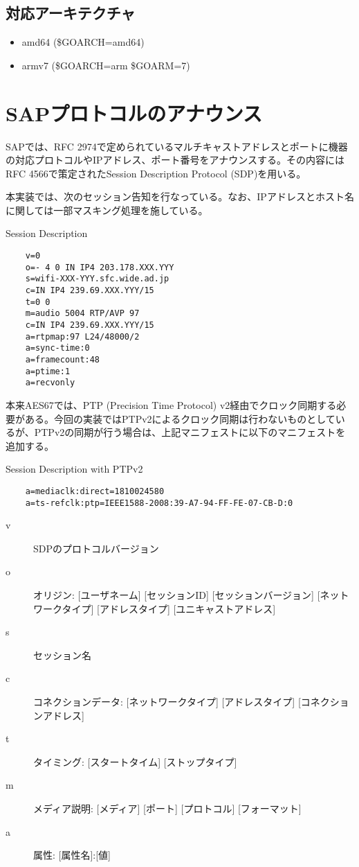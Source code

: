 \subsection{対応アーキテクチャ}

\begin{itemize}
  \item amd64 (\$GOARCH=amd64)
  \item armv7 (\$GOARCH=arm \$GOARM=7)
\end{itemize}

\section{SAPプロトコルのアナウンス}

SAPでは、RFC 2974\cite{rfc2974}で定められているマルチキャストアドレスとポートに機器の対応プロトコルやIPアドレス、ポート番号をアナウンスする。その内容にはRFC 4566\cite{rfc4566}で策定されたSession Description Protocol (SDP)を用いる。

本実装では、次のセッション告知を行なっている。なお、IPアドレスとホスト名に関しては一部マスキング処理を施している。

\begin{itembox}[l]{Session Description}
  \begin{verbatim}
    v=0
    o=- 4 0 IN IP4 203.178.XXX.YYY
    s=wifi-XXX-YYY.sfc.wide.ad.jp
    c=IN IP4 239.69.XXX.YYY/15
    t=0 0
    m=audio 5004 RTP/AVP 97
    c=IN IP4 239.69.XXX.YYY/15
    a=rtpmap:97 L24/48000/2
    a=sync-time:0
    a=framecount:48
    a=ptime:1
    a=recvonly
  \end{verbatim}
\end{itembox}

本来AES67では、PTP (Precision Time Protocol) v2経由でクロック同期する必要がある。今回の実装ではPTPv2によるクロック同期は行わないものとしているが、PTPv2の同期が行う場合は、上記マニフェストに以下のマニフェストを追加する。

\begin{itembox}[l]{Session Description with PTPv2}
  \begin{verbatim}
    a=mediaclk:direct=1810024580
    a=ts-refclk:ptp=IEEE1588-2008:39-A7-94-FF-FE-07-CB-D:0
  \end{verbatim}
\end{itembox}

\begin{description}
  \item[v] SDPのプロトコルバージョン
  \item[o] オリジン: [ユーザネーム] [セッションID] [セッションバージョン] [ネットワークタイプ] [アドレスタイプ] [ユニキャストアドレス]
  \item[s] セッション名
  \item[c] コネクションデータ: [ネットワークタイプ] [アドレスタイプ] [コネクションアドレス]
  \item[t] タイミング: [スタートタイム] [ストップタイプ]
  \item[m] メディア説明: [メディア] [ポート] [プロトコル] [フォーマット]
  \item[a] 属性: [属性名]:[値]
\end{description}


